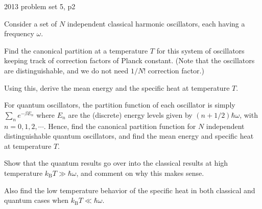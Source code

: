 {2013 problem set 5, p2}{
Consider a set of $N$ independent classical harmonic oscillators, each having a frequency $\omega$. 

Find the canonical partition at a temperature $T$ for this system of oscillators keeping track of correction factors of Planck constant. (Note that the oscillators are distinguishable, and we do not need $1/N!$ correction factor.)  

Using this, derive the mean energy and the specific heat at temperature $T$. 

For quantum oscillators, the partition function of each oscillator is simply $\sum_n e^{-\beta E_n}$ where $E_n$ are the (discrete) energy levels given by $(n + 1/2)\hbar \omega$, with $n = 0,1,2,\cdots$.  Hence, find the canonical partition function for $N$ independent distinguishable quantum oscillators, and find the mean energy and specific heat at temperature $T$. 

Show that the quantum results go over into the classical results at high temperature $k_{\mathrm{B}} T \gg \hbar \omega$, and comment on why this makes sense.  

Also find the low temperature behavior of the specific heat in both classical and quantum cases when $k_{\mathrm{B}} T \ll \hbar \omega$.
} %

